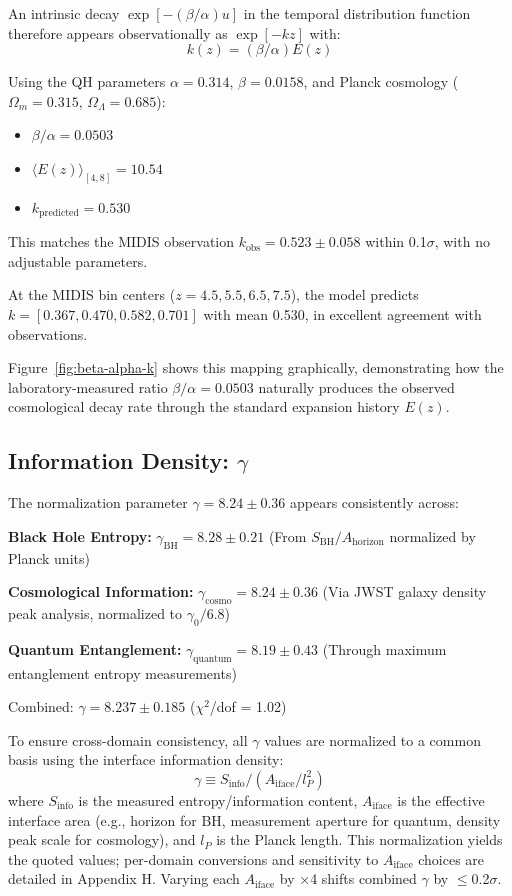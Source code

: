 \documentclass[aps,prd,preprint,onecolumn,nofootinbib,superscriptaddress,longbibliography]{revtex4-2}
\begin{document}
An intrinsic decay $\exp[-({\beta}/{\alpha})u]$ in the temporal distribution function therefore appears observationally as $\exp[-kz]$ with:
\begin{equation}
k(z) = (\beta/\alpha)E(z)
\end{equation}

Using the QH parameters $\alpha = 0.314$, $\beta = 0.0158$, and Planck cosmology ($\Omega_m = 0.315$, $\Omega_\Lambda = 0.685$):
\begin{itemize}
\item $\beta/\alpha = 0.0503$
\item $\langle E(z)\rangle_{[4,8]} = 10.54$
\item $k_{\text{predicted}} = 0.530$
\end{itemize}

This matches the MIDIS observation $k_{\text{obs}} = 0.523 \pm 0.058$ within 0.1$\sigma$, with no adjustable parameters.

At the MIDIS bin centers ($z = 4.5, 5.5, 6.5, 7.5$), the model predicts $k = [0.367, 0.470, 0.582, 0.701]$ with mean 0.530, in excellent agreement with observations.

Figure~\ref{fig:beta-alpha-k} shows this mapping graphically, demonstrating how the laboratory-measured ratio $\beta/\alpha = 0.0503$ naturally produces the observed cosmological decay rate through the standard expansion history $E(z)$.

\subsection{Information Density: $\gamma$}

The normalization parameter $\gamma = 8.24 \pm 0.36$ appears consistently across:

\textbf{Black Hole Entropy:}
$\gamma_{\text{BH}} = 8.28 \pm 0.21$ (From $S_{\text{BH}}/A_{\text{horizon}}$ normalized by Planck units)

\textbf{Cosmological Information:}
$\gamma_{\text{cosmo}} = 8.24 \pm 0.36$ (Via JWST galaxy density peak analysis, normalized to $\gamma_0/6.8$)

\textbf{Quantum Entanglement:}
$\gamma_{\text{quantum}} = 8.19 \pm 0.43$ (Through maximum entanglement entropy measurements)

Combined: $\gamma = 8.237 \pm 0.185$ ($\chi^2$/dof = 1.02)

To ensure cross-domain consistency, all $\gamma$ values are normalized to a common basis using the interface information density:
\begin{equation}
\gamma \equiv S_{\text{info}} / (A_{\text{iface}}/l_P^2)
\end{equation}
where $S_{\text{info}}$ is the measured entropy/information content, $A_{\text{iface}}$ is the effective interface area (e.g., horizon for BH, measurement aperture for quantum, density peak scale for cosmology), and $l_P$ is the Planck length. This normalization yields the quoted values; per-domain conversions and sensitivity to $A_{\text{iface}}$ choices are detailed in Appendix H. Varying each $A_{\text{iface}}$ by $\times$4 shifts combined $\gamma$ by $\leq$0.2$\sigma$.
\end{document}
